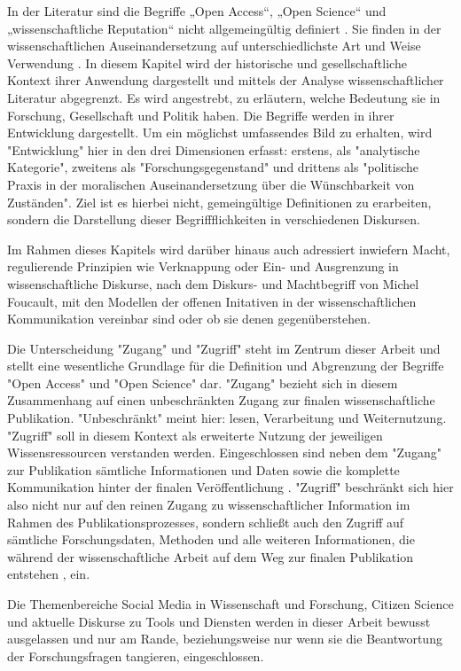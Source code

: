 In der Literatur sind die Begriffe „Open Access“, „Open Science“ und „wissenschaftliche Reputation“ nicht allgemeingültig definiert \cite{suchen}. Sie finden in der wissenschaftlichen Auseinandersetzung auf unterschiedlichste Art und Weise Verwendung \cite{cite:9}. In diesem Kapitel wird der historische und gesellschaftliche Kontext ihrer Anwendung dargestellt und mittels der Analyse wissenschaftlicher Literatur abgegrenzt. Es wird angestrebt, zu erläutern, welche Bedeutung sie in Forschung, Gesellschaft und Politik haben. Die Begriffe werden in ihrer Entwicklung dargestellt. Um ein möglichst umfassendes Bild zu erhalten, wird "Entwicklung" hier in den drei Dimensionen erfasst: erstens, als "analytische Kategorie", zweitens als "Forschungsgegenstand" und drittens als "politische Praxis in der moralischen Auseinandersetzung über die Wünschbarkeit von Zuständen". \cite{cite:10} Ziel ist es hierbei nicht, gemeingültige Definitionen zu erarbeiten, sondern die Darstellung dieser Begriffflichkeiten in verschiedenen Diskursen. 

Im Rahmen dieses Kapitels wird darüber hinaus auch adressiert inwiefern Macht, regulierende Prinzipien wie Verknappung oder Ein- und Ausgrenzung in wissenschaftliche Diskurse, nach dem Diskurs- und Machtbegriff von Michel Foucault, mit den Modellen der offenen Initativen in der wissenschaftlichen Kommunikation vereinbar sind oder ob sie denen gegenüberstehen.

Die Unterscheidung "Zugang" und "Zugriff" steht im Zentrum dieser Arbeit und stellt eine wesentliche Grundlage für die Definition und Abgrenzung der Begriffe "Open Access" und "Open Science" dar. "Zugang" bezieht sich in diesem Zusammenhang auf einen unbeschränkten Zugang zur finalen wissenschaftliche Publikation. "Unbeschränkt" meint hier: lesen\cite{cite:9a}, Verarbeitung und Weiternutzung. "Zugriff" soll in diesem Kontext als erweiterte Nutzung der jeweiligen Wissensressourcen verstanden werden. Eingeschlossen sind neben dem "Zugang" zur Publikation sämtliche Informationen und Daten sowie die komplette Kommunikation hinter der finalen Veröffentlichung \cite{cite:9b}. "Zugriff" beschränkt sich hier also nicht nur auf den reinen Zugang zu wissenschaftlicher Information im Rahmen des Publikationsprozesses, sondern schließt auch den Zugriff auf sämtliche Forschungsdaten, Methoden und alle weiteren Informationen, die während der wissenschaftliche Arbeit auf dem Weg zur finalen Publikation entstehen \cite{cite:9c}, ein.

Die Themenbereiche Social Media in Wissenschaft und Forschung, Citizen Science und aktuelle Diskurse zu Tools und Diensten werden in dieser Arbeit bewusst ausgelassen und nur am Rande, beziehungsweise nur wenn sie die Beantwortung der Forschungsfragen tangieren, eingeschlossen.

